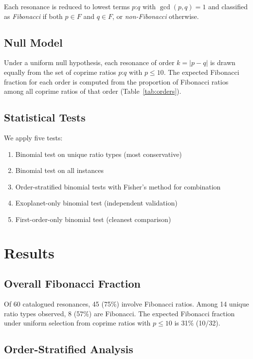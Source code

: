 \documentclass[twocolumn,11pt]{article}
\begin{document}
Each resonance is reduced to lowest terms $p$:$q$ with
$\gcd(p,q) = 1$ and classified as \emph{Fibonacci} if both
$p \in F$ and $q \in F$, or \emph{non-Fibonacci} otherwise.

\subsection{Null Model}

Under a uniform null hypothesis, each resonance of order $k = |p-q|$
is drawn equally from the set of coprime ratios $p$:$q$ with
$p \leq 10$.  The expected Fibonacci fraction for each order is
computed from the proportion of Fibonacci ratios among all coprime
ratios of that order (Table~\ref{tab:orders}).

\subsection{Statistical Tests}

We apply five tests:
\begin{enumerate}
\item Binomial test on unique ratio types (most conservative)
\item Binomial test on all instances
\item Order-stratified binomial tests with Fisher's method for combination
\item Exoplanet-only binomial test (independent validation)
\item First-order-only binomial test (cleanest comparison)
\end{enumerate}

\section{Results}
\label{sec:results}

\subsection{Overall Fibonacci Fraction}

Of 60 catalogued resonances, 45 (75\%) involve Fibonacci ratios.
Among 14 unique ratio types observed, 8 (57\%) are Fibonacci.  The
expected Fibonacci fraction under uniform selection from coprime
ratios with $p \leq 10$ is 31\% (10/32).

\subsection{Order-Stratified Analysis}
\end{document}
